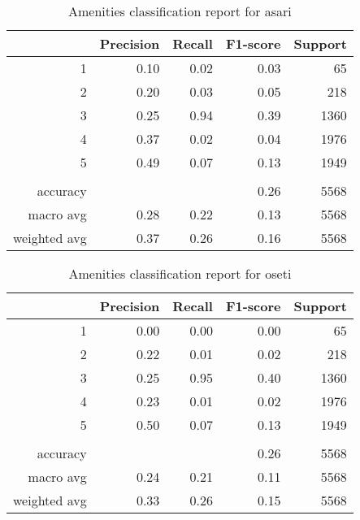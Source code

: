 \documentclass[12pt]{article}
\begin{document}
	\begin{table}
		\begin{center}
			{\renewcommand{\arraystretch}{1.5}
				\renewcommand{\tabcolsep}{0.2cm}
				\begin{tabular}{r r r r r}
					& Precision & Recall & F1-score & Support\\
					\hline
					1 & 0.10 & 0.02 & 0.03 & 65\\
					2 & 0.20 & 0.03 & 0.05 & 218\\
					3 & 0.25 & 0.94 & 0.39 & 1360\\
					4 & 0.37 & 0.02 & 0.04 & 1976\\
					5 & 0.49 & 0.07 & 0.13 & 1949\\
					& & & & \\
					accuracy & & & 0.26 & 5568\\
					macro avg & 0.28 & 0.22 & 0.13 & 5568\\
					weighted avg & 0.37 & 0.26 & 0.16 & 5568
			\end{tabular}}
		\end{center}
		\caption{Amenities classification report for asari}
	\end{table}
	
	\begin{table}
		\begin{center}
			{\renewcommand{\arraystretch}{1.5}
				\renewcommand{\tabcolsep}{0.2cm}
				\begin{tabular}{r r r r r}
					& Precision & Recall & F1-score & Support\\
					\hline
					1 & 0.00 & 0.00 & 0.00 & 65\\
					2 & 0.22 & 0.01 & 0.02 & 218\\
					3 & 0.25 & 0.95 & 0.40 & 1360\\
					4 & 0.23 & 0.01 & 0.02 & 1976\\
					5 & 0.50 & 0.07 & 0.13 & 1949\\
					& & & & \\
					accuracy & & & 0.26 & 5568\\
					macro avg & 0.24 & 0.21 & 0.11 & 5568\\
					weighted avg & 0.33 & 0.26 & 0.15 & 5568
			\end{tabular}}
		\end{center}
		\caption{Amenities classification report for oseti}
	\end{table}
	
\end{document}
